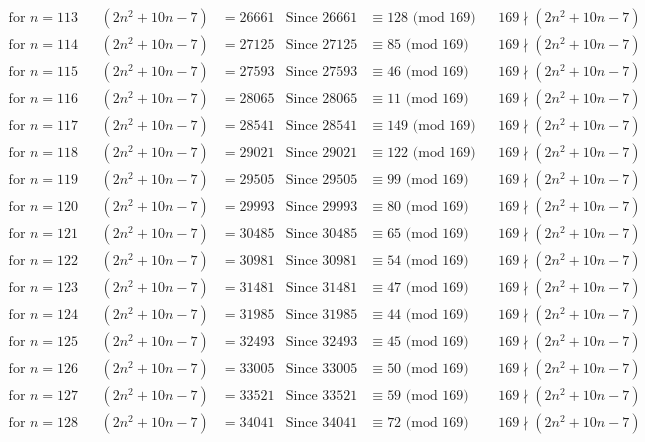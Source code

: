 \documentclass[12pt]{article}
\begin{document}
\begin{align*}
\text{for $n = 113 $}&& (2n^2+10n-7) &= 26661 & \text{Since } 26661  &\equiv  128 \text{ (mod $169$)}&& 169 \nmid (2n^2+10n-7)\\
\text{for $n = 114 $}&& (2n^2+10n-7) &= 27125 & \text{Since } 27125  &\equiv  85 \text{ (mod $169$)}&& 169 \nmid (2n^2+10n-7)\\
\text{for $n = 115 $}&& (2n^2+10n-7) &= 27593 & \text{Since } 27593  &\equiv  46 \text{ (mod $169$)}&& 169 \nmid (2n^2+10n-7)\\
\text{for $n = 116 $}&& (2n^2+10n-7) &= 28065 & \text{Since } 28065  &\equiv  11 \text{ (mod $169$)}&& 169 \nmid (2n^2+10n-7)\\
\text{for $n = 117 $}&& (2n^2+10n-7) &= 28541 & \text{Since } 28541  &\equiv  149 \text{ (mod $169$)}&& 169 \nmid (2n^2+10n-7)\\
\text{for $n = 118 $}&& (2n^2+10n-7) &= 29021 & \text{Since } 29021  &\equiv  122 \text{ (mod $169$)}&& 169 \nmid (2n^2+10n-7)\\
\text{for $n = 119 $}&& (2n^2+10n-7) &= 29505 & \text{Since } 29505  &\equiv  99 \text{ (mod $169$)}&& 169 \nmid (2n^2+10n-7)\\
\text{for $n = 120 $}&& (2n^2+10n-7) &= 29993 & \text{Since } 29993  &\equiv  80 \text{ (mod $169$)}&& 169 \nmid (2n^2+10n-7)\\
\text{for $n = 121 $}&& (2n^2+10n-7) &= 30485 & \text{Since } 30485  &\equiv  65 \text{ (mod $169$)}&& 169 \nmid (2n^2+10n-7)\\
\text{for $n = 122 $}&& (2n^2+10n-7) &= 30981 & \text{Since } 30981  &\equiv  54 \text{ (mod $169$)}&& 169 \nmid (2n^2+10n-7)\\
\text{for $n = 123 $}&& (2n^2+10n-7) &= 31481 & \text{Since } 31481  &\equiv  47 \text{ (mod $169$)}&& 169 \nmid (2n^2+10n-7)\\
\text{for $n = 124 $}&& (2n^2+10n-7) &= 31985 & \text{Since } 31985  &\equiv  44 \text{ (mod $169$)}&& 169 \nmid (2n^2+10n-7)\\
\text{for $n = 125 $}&& (2n^2+10n-7) &= 32493 & \text{Since } 32493  &\equiv  45 \text{ (mod $169$)}&& 169 \nmid (2n^2+10n-7)\\
\text{for $n = 126 $}&& (2n^2+10n-7) &= 33005 & \text{Since } 33005  &\equiv  50 \text{ (mod $169$)}&& 169 \nmid (2n^2+10n-7)\\
\text{for $n = 127 $}&& (2n^2+10n-7) &= 33521 & \text{Since } 33521  &\equiv  59 \text{ (mod $169$)}&& 169 \nmid (2n^2+10n-7)\\
\text{for $n = 128 $}&& (2n^2+10n-7) &= 34041 & \text{Since } 34041  &\equiv  72 \text{ (mod $169$)}&& 169 \nmid (2n^2+10n-7)\\

\end{align*}
\end{document}
